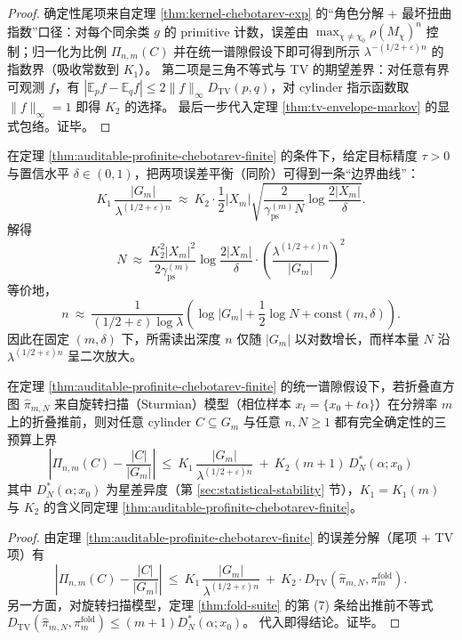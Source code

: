 \begin{proof}
确定性尾项来自定理 \ref{thm:kernel-chebotarev-exp} 的“角色分解 + 最坏扭曲指数”口径：对每个同余类 \(g\) 的 primitive 计数，误差由 \(\max_{\chi\ne\chi_0}\rho(M_\chi)^n\) 控制；归一化为比例 \(\Pi_{n,m}(C)\) 并在统一谱隙假设下即可得到所示 \(\lambda^{-(1/2+\varepsilon)n}\) 的指数界（吸收常数到 \(K_1\)）。
第二项是三角不等式与 TV 的期望差界：对任意有界可观测 \(f\)，有 \(|\mathbb{E}_p f-\mathbb{E}_q f|\le 2\|f\|_\infty D_{\mathrm{TV}}(p,q)\)，对 cylinder 指示函数取 \(\|f\|_\infty=1\) 即得 \(K_2\) 的选择。
最后一步代入定理 \ref{thm:tv-envelope-markov} 的显式包络。证毕。
\end{proof}

\begin{corollary}\label{cor:auditable-profinite-chebotarev-tradeoff}
在定理 \ref{thm:auditable-profinite-chebotarev-finite} 的条件下，给定目标精度 \(\tau>0\) 与置信水平 \(\delta\in(0,1)\)，把两项误差平衡（同阶）可得到一条“边界曲线”：
\[
K_1\,\frac{|G_m|}{\lambda^{(1/2+\varepsilon)n}}
\ \approx\
K_2\cdot \frac12|X_m|\sqrt{\frac{2}{\gamma_{\mathrm{ps}}^{(m)}N}\log\frac{2|X_m|}{\delta}}.
\]
解得
\[
\boxed{\;
N\ \approx\
\frac{K_2^2|X_m|^2}{2\gamma_{\mathrm{ps}}^{(m)}}\log\frac{2|X_m|}{\delta}\cdot
\left(\frac{\lambda^{(1/2+\varepsilon)n}}{|G_m|}\right)^2
\;}
\]
等价地，
\[
\boxed{\;
n\ \approx\
\frac{1}{(1/2+\varepsilon)\log\lambda}\left(\log|G_m|+\frac12\log N+\mathrm{const}(m,\delta)\right).
\;}
\]
因此在固定 \((m,\delta)\) 下，所需读出深度 \(n\) 仅随 \(|G_m|\) 以对数增长，而样本量 \(N\) 沿 \(\lambda^{(1/2+\varepsilon)n}\) 呈二次放大。
\end{corollary}

\begin{corollary}[确定性三预算定律：差异度 \texorpdfstring{$\Rightarrow$}{=>} TV \texorpdfstring{$\Rightarrow$}{=>} Chebotarev]\label{cor:auditable-profinite-chebotarev-three-budget-deterministic}
在定理 \ref{thm:auditable-profinite-chebotarev-finite} 的统一谱隙假设下，若折叠直方图 \(\hat{\pi}_{m,N}\) 来自旋转扫描（Sturmian）模型（相位样本 \(x_t=\{x_0+t\alpha\}\)）在分辨率 \(m\) 上的折叠推前，则对任意 cylinder \(C\subseteq G_m\) 与任意 \(n,N\ge 1\) 都有完全确定性的三预算上界
\[
\boxed{\;
\left|\Pi_{n,m}(C)-\frac{|C|}{|G_m|}\right|
\ \le\
K_1\,\frac{|G_m|}{\lambda^{(1/2+\varepsilon)n}}
\ +\
K_2\,(m+1)\,D_N^*(\alpha;x_0)\;}
\]
其中 \(D_N^*(\alpha;x_0)\) 为星差异度（第 \ref{sec:statistical-stability} 节），\(K_1=K_1(m)\) 与 \(K_2\) 的含义同定理 \ref{thm:auditable-profinite-chebotarev-finite}。
\end{corollary}
\begin{proof}
由定理 \ref{thm:auditable-profinite-chebotarev-finite} 的误差分解（尾项 \(+\) TV 项）有
\[
\left|\Pi_{n,m}(C)-\frac{|C|}{|G_m|}\right|
\ \le\
K_1\,\frac{|G_m|}{\lambda^{(1/2+\varepsilon)n}}
\ +\
K_2\cdot D_{\mathrm{TV}}(\hat{\pi}_{m,N},\pi_m^{\mathrm{fold}}).
\]
另一方面，对旋转扫描模型，定理 \ref{thm:fold-suite} 的第 (7) 条给出推前不等式
\(
D_{\mathrm{TV}}(\hat{\pi}_{m,N},\pi_m^{\mathrm{fold}})\le (m+1)D_N^*(\alpha;x_0)
\)。
代入即得结论。证毕。
\end{proof}

